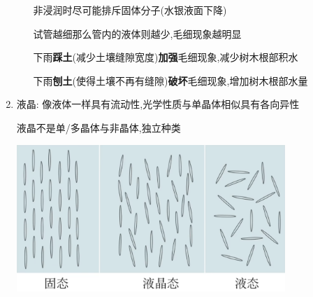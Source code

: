 \documentclass{article}
\begin{document}
\begin{enumerate}
\begin{enumerate}[label = (\arabic*)]
\begin{minipage}{0.7\textwidth}
                        非浸润时尽可能排斥固体分子(水银液面下降)

                        试管越细那么管内的液体则越少,毛细现象越明显

                        下雨\textbf{踩土}(减少土壤缝隙宽度)\textbf{加强}毛细现象,减少树木根部积水

                        下雨\textbf{刨土}(使得土壤不再有缝隙)\textbf{破坏}毛细现象,增加树木根部水量
                    \end{minipage}
          \end{enumerate}

    \item 液晶: 像液体一样具有流动性,光学性质与单晶体相似具有各向异性

          \hspace{2.4em} 液晶不是单/多晶体与非晶体,独立种类

          \begin{center}
              \includegraphics[width = 0.8\textwidth]{./pictures/25.png}
          \end{center}
\end{enumerate}

\vspace{2em}
\end{document}
